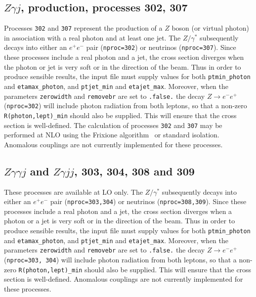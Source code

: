 \documentclass[12pt]{article}
\begin{document}
\subsection{$Z\gamma j$, production, processes 302, 307}
\label{subsec:zgammajet}
Processes {\tt 302} and {\tt 307} represent the production of a $Z$ boson (or virtual photon)
in association with a real photon and at least one jet. 
The $Z/\gamma^*$ subsequently decays into 
either an $e^+ e^-$ pair ({\tt nproc=302}) or neutrinos ({\tt nproc=307}).
Since these processes include a real photon and a jet, the cross section diverges
when the photon or jet is very soft or in the direction of the beam.
Thus in order to produce sensible results, the input file must supply values for both
{\tt ptmin\_photon} and {\tt etamax\_photon}, and {\tt ptjet\_min} and {\tt etajet\_max}.
 Moreover, when the parameters {\tt zerowidth}
and {\tt removebr} are set to {\tt .false.} the decay $Z \to e^- e^+$ ({\tt nproc=302})
will include photon radiation from both leptons, so that a non-zero {\tt R(photon,lept)\_min}
should also be supplied. This will ensure that the cross section is well-defined.
The calculation of processes {\tt 302} and {\tt 307} may be performed
at NLO using the Frixione algorithm~\cite{Frixione:1998jh} or standard isolation. 
Anomalous couplings are not currently implemented for these processes. 


\subsection{$Z\gamma\gamma j$ and $Z\gamma j j $, 303, 304, 308 and 309}

These processes are available at LO only. The $Z/\gamma^*$ subsequently decays into 
either an $e^+ e^-$ pair ({\tt nproc=303,304}) or neutrinos ({\tt nproc=308,309}). 
Since these processes include a real photon and a jet, the cross section diverges
when a photon or a jet is very soft or in the direction of the beam.
Thus in order to produce sensible results, the input file must supply values for both
{\tt ptmin\_photon} and {\tt etamax\_photon}, and {\tt ptjet\_min} and {\tt etajet\_max}.
 Moreover, when the parameters {\tt zerowidth}
and {\tt removebr} are set to {\tt .false.} the decay $Z \to e^- e^+$ ({\tt nproc=303, 304})
will include photon radiation from both leptons, so that a non-zero {\tt R(photon,lept)\_min}
should also be supplied. This will ensure that the cross section is well-defined.
Anomalous couplings are not currently implemented for these processes. 
\end{document}

